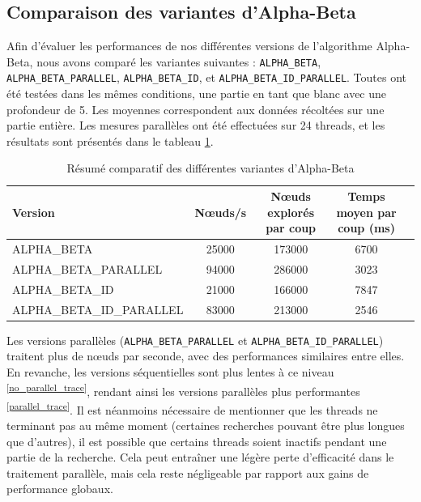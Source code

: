 \documentclass{article}
\begin{document}
\subsection{Comparaison des variantes d'Alpha-Beta} Afin d'évaluer les performances de nos différentes versions de l'algorithme Alpha-Beta, nous avons comparé les variantes suivantes : \texttt{ALPHA\_BETA}, \texttt{ALPHA\_BETA\_PARALLEL}, \texttt{ALPHA\_BETA\_ID}, et \texttt{ALPHA\_BETA\_ID\_PARALLEL}. Toutes ont été testées dans les mêmes conditions, une partie en tant que blanc avec une profondeur de 5. Les moyennes correspondent aux données récoltées sur une partie entière. Les mesures parallèles ont été effectuées sur 24 threads, et les résultats sont présentés dans le tableau \ref{tab:ab_comparison}.

\begin{table}[h]
    \centering
    \caption{Résumé comparatif des différentes variantes d'Alpha-Beta}
    \label{tab:ab_comparison}
    \begin{tabular}{|l|c|c|c|c|}
        \hline
        \textbf{Version} & \textbf{Nœuds/s} & \textbf{Nœuds explorés par coup} & \textbf{Temps moyen par coup (ms)} \\
        \hline
        ALPHA\_BETA & 25000 & 173000 & 6700 \\
        \hline
        ALPHA\_BETA\_PARALLEL & 94000 & 286000 & 3023 \\
        \hline
        ALPHA\_BETA\_ID & 21000 & 166000 & 7847 \\
        \hline
        ALPHA\_BETA\_ID\_PARALLEL & 83000 & 213000 & 2546 \\
        \hline
    \end{tabular}
\end{table}
\FloatBarrier

Les versions parallèles (\texttt{ALPHA\_BETA\_PARALLEL} et \texttt{ALPHA\_BETA\_ID\_PARALLEL}) traitent plus de nœuds par seconde, avec des performances similaires entre elles. En revanche, les versions séquentielles sont plus lentes à ce niveau \textsuperscript{\ref{no_parallel_trace}}, rendant ainsi les versions parallèles plus performantes \textsuperscript{\ref{parallel_trace}}. 
Il est néanmoins nécessaire de mentionner que les threads ne terminant pas au même moment (certaines recherches pouvant être plus longues que d'autres), il est possible que certains threads soient inactifs pendant une partie de la recherche. Cela peut entraîner une légère perte d'efficacité dans le traitement parallèle, mais cela reste négligeable par rapport aux gains de performance globaux.
\end{document}
